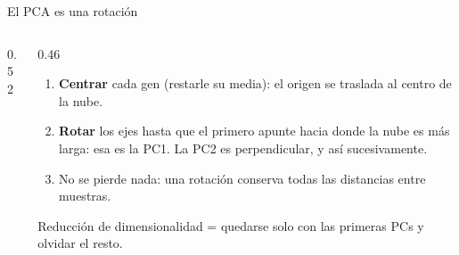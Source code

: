 \begin{frame}{El PCA es una rotación}
  \begin{columns}[c]
    \begin{column}{0.52\linewidth}
      \centering
    \end{column}
    \begin{column}{0.46\linewidth}\small
      \begin{enumerate}\setlength\itemsep{4pt}
        \item \textbf{Centrar} cada gen (restarle su media): el origen se traslada al centro de la nube.
        \item \textbf{Rotar} los ejes hasta que el primero apunte hacia donde la nube es más larga: esa es la \alert{PC1}. La PC2 es perpendicular, y así sucesivamente.
        \item No se pierde nada: una rotación conserva todas las distancias entre muestras.
      \end{enumerate}
      \vspace{0.2cm}
      \begin{block}{Reducción de dimensionalidad}
        \footnotesize = quedarse solo con las primeras PCs y olvidar el resto.
      \end{block}
    \end{column}
  \end{columns}
\end{frame}

